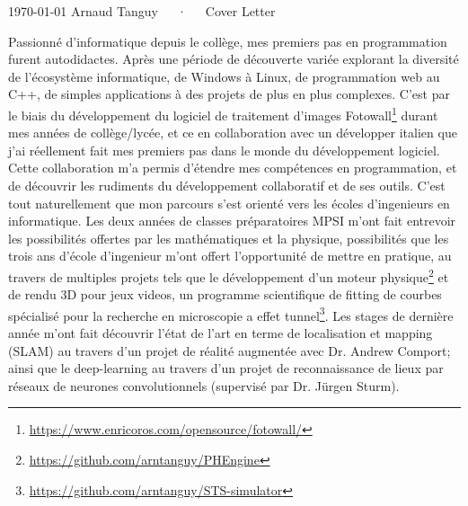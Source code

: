 \documentclass[11pt, a4paper]{awesome-cv}
\begin{document}
\makecvheader[R]

\makecvfooter
  {\today}
  {Arnaud Tanguy~~~·~~~Cover Letter}
  {}

\makelettertitle

\begin{cvletter}

  Passionné d'informatique depuis le collège, mes premiers pas en programmation furent autodidactes. Après une période de découverte variée explorant la diversité de l'écosystème informatique, de Windows à Linux, de programmation web au C++, de simples applications à des projets de plus en plus complexes. C'est par le biais du développement du logiciel de traitement d'images Fotowall\footnote{\url{https://www.enricoros.com/opensource/fotowall/}} durant mes années de collège/lycée, et ce en collaboration avec un développer italien que j'ai réellement fait mes premiers pas dans le monde du développement logiciel. Cette collaboration m'a permis d'étendre mes compétences en programmation, et de découvrir les rudiments du développement collaboratif et de ses outils. C'est tout naturellement que mon parcours s'est orienté vers les écoles d'ingenieurs en informatique. Les deux années de classes préparatoires MPSI m'ont fait entrevoir les possibilités offertes par les mathématiques et la physique, possibilités que les trois ans d'école d'ingenieur m'ont offert l'opportunité de mettre en pratique, au travers de multiples projets tels que le développement d'un moteur physique\footnote{\url{https://github.com/arntanguy/PHEngine}} et de rendu 3D pour jeux videos, un programme scientifique de fitting de courbes spécialisé pour la recherche en microscopie a effet tunnel\footnote{\url{https://github.com/arntanguy/STS-simulator}}. Les stages de dernière année m'ont fait découvrir l'état de l'art en terme de localisation et mapping (SLAM) au travers d'un projet de réalité augmentée avec Dr. Andrew Comport; ainsi que le deep-learning au travers d'un projet de reconnaissance de lieux par réseaux de neurones convolutionnels (supervisé par Dr. Jürgen Sturm).


\end{cvletter}
\end{document}
